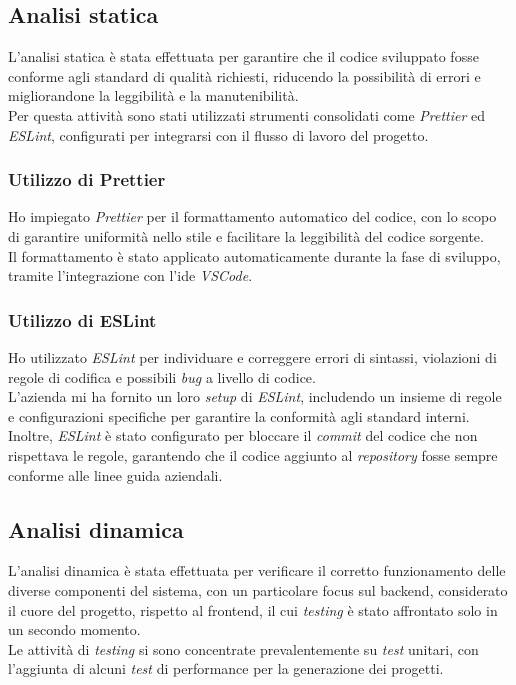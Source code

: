 \subsection{Analisi statica}
\label{subsec:analisi-statica}

L’analisi statica è stata effettuata per garantire che il codice sviluppato fosse conforme agli standard di qualità richiesti, riducendo la possibilità di errori e migliorandone la leggibilità e la manutenibilità.\\
Per questa attività sono stati utilizzati strumenti consolidati come \textit{Prettier} ed \textit{ESLint}, configurati per integrarsi con il flusso di lavoro del progetto.\\

\subsubsection{Utilizzo di Prettier}  
Ho impiegato \textit{Prettier} per il formattamento automatico del codice, con lo scopo di garantire uniformità nello stile e facilitare la leggibilità del codice sorgente.\\
Il formattamento è stato applicato automaticamente durante la fase di sviluppo, tramite l'integrazione con l'\gls{ide} \textit{VSCode}.

\subsubsection{Utilizzo di ESLint}  
Ho utilizzato \textit{ESLint} per individuare e correggere errori di sintassi, violazioni di regole di codifica e possibili \textit{bug} a livello di codice. \\
L’azienda mi ha fornito un loro \textit{setup} di \textit{ESLint}, includendo un insieme di regole e configurazioni specifiche per garantire la conformità agli standard interni.\\
Inoltre, \textit{ESLint} è stato configurato per bloccare il \textit{commit} del codice che non rispettava le regole, garantendo che il codice aggiunto al \textit{repository} fosse sempre conforme alle linee guida aziendali.

\subsection{Analisi dinamica}
\label{subsec:analisi-dinamica}

L’analisi dinamica è stata effettuata per verificare il corretto funzionamento delle diverse componenti del sistema, con un particolare focus sul \gls{backend}, considerato il cuore del progetto, rispetto al \gls{frontend}, il cui \textit{testing} è stato affrontato solo in un secondo momento. \\
Le attività di \textit{testing} si sono concentrate prevalentemente su \textit{test} unitari, con l'aggiunta di alcuni \textit{test} di performance per la generazione dei progetti.\\

